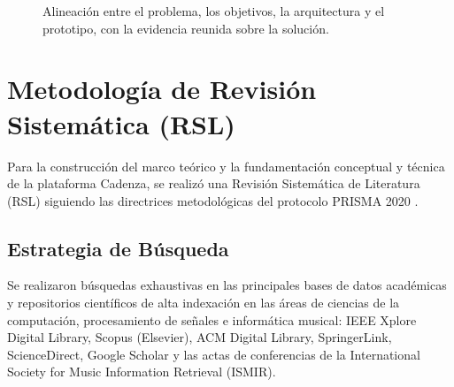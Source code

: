 \documentclass[conference]{IEEEtran}
\begin{document}
\begin{figure}[!t]
    \caption{Alineación entre el problema, los objetivos, la arquitectura y el prototipo, con la evidencia reunida sobre la solución.}
    \label{fig:alineacion-objetivos}
\end{figure}
\section{Metodología de Revisión Sistemática (RSL)}
\label{sec:metodologia-rsl}

Para la construcción del marco teórico y la fundamentación conceptual y técnica de la plataforma Cadenza, se realizó una Revisión Sistemática de Literatura (RSL) siguiendo las directrices metodológicas del protocolo PRISMA 2020 \cite{prisma2020}.

\subsection{Estrategia de Búsqueda}
\label{sec:estrategia-busqueda}

Se realizaron búsquedas exhaustivas en las principales bases de datos académicas y repositorios científicos de alta indexación en las áreas de ciencias de la computación, procesamiento de señales e informática musical: IEEE Xplore Digital Library, Scopus (Elsevier), ACM Digital Library, SpringerLink, ScienceDirect, Google Scholar y las actas de conferencias de la International Society for Music Information Retrieval (ISMIR).
\end{document}
